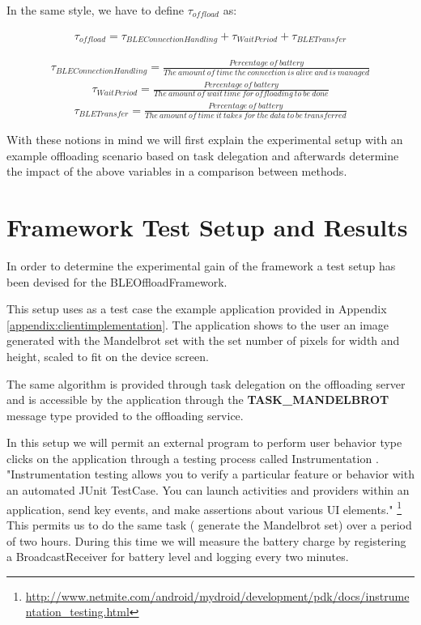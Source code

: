 In the same style, we have to define \(\tau_{offload}\) as:

\begin{align}
\tau_{offload} = \tau_{BLEConnectionHandling} + \tau_{WaitPeriod} + \tau_{BLETransfer}
\end{align}

\begin{align}
\tau_{BLEConnectionHandling} = \tfrac{Percentage\ of\ battery}{The\ amount\ of\ time\ the\ connection\ is\ alive\ and\ is\ managed} 
\end{align}
\begin{align}
\tau_{WaitPeriod} = \tfrac{Percentage\ of\ battery}{The\ amount\ of\ wait\ time\ for\ offloading\ to\ be\ done} 
\end{align}
\begin{align}
\tau_{BLETransfer} = \tfrac{Percentage\ of\ battery}{The\ amount\ of\ time\ it\ takes\ for\ the\ data\ to\ be\ transferred}
\end{align}

With these notions in mind we will first explain the experimental setup with an example offloading scenario based on task delegation and afterwards determine the impact of the above variables in a comparison between methods.

\section{Framework Test Setup and Results}

In order to determine the experimental gain of the framework a test setup has been devised for the BLEOffloadFramework. 

This setup uses as a test case the example application provided in Appendix \ref{appendix:clientimplementation}. The application shows to the user an image generated with the Mandelbrot set \cite{mandelbrot2013fractals} with the set number of pixels for width and height, scaled to fit on the device screen.

The same algorithm is provided through task delegation on the offloading server and is accessible by the application through the \textbf{TASK_MANDELBROT} message type provided to the offloading service.

In this setup we will permit an external program to perform user behavior type clicks on the application through a testing process called Instrumentation \cite{kropp2010automated}. "Instrumentation testing allows you to verify a particular feature or behavior with an automated JUnit TestCase. You can launch activities and providers within an application, send key events, and make assertions about various UI elements." \footnote{\url{http://www.netmite.com/android/mydroid/development/pdk/docs/instrumentation_testing.html}} This permits us to do the same task ( generate the Mandelbrot set) over a period of two hours. During this time we will measure the battery charge by registering a BroadcastReceiver for battery level and logging every two minutes.

